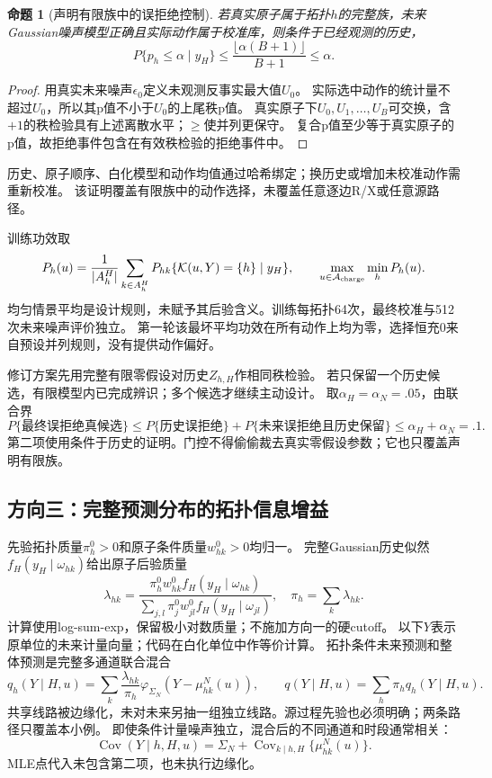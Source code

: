 \documentclass[UTF8,fontset=fandol,11pt,a4paper]{ctexart}
\newtheorem{proposition}{命题}
\begin{document}
\begin{proposition}[声明有限族中的误拒绝控制]
若真实原子属于拓扑$h$的完整族，未来Gaussian噪声模型正确且实际动作属于校准库，则条件于已经观测的历史，
\[
 P\{p_h\le\alpha\mid y_H\}
 \le\frac{\lfloor\alpha(B+1)\rfloor}{B+1}\le\alpha .
\]
\end{proposition}
\begin{proof}
用真实未来噪声$\epsilon_0$定义未观测反事实最大值$U_0$。
实际选中动作的统计量不超过$U_0$，所以其p值不小于$U_0$的上尾秩p值。
真实原子下$U_0,U_1,\ldots,U_B$可交换，含$+1$的秩检验具有上述离散水平；$\ge$使并列更保守。
复合p值至少等于真实原子的p值，故拒绝事件包含在有效秩检验的拒绝事件中。
\end{proof}
历史、原子顺序、白化模型和动作均值通过哈希绑定；换历史或增加未校准动作需重新校准。
该证明覆盖有限族中的动作选择，未覆盖任意逐边R/X或任意源路径。

训练功效取
\[
 P_h(u)=\frac1{|A_h^H|}\sum_{k\in A_h^H}
 P_{hk}\{\mathcal K(u,Y)=\{h\}\mid y_H\},
 \qquad \max_{u\in\mathcal A_{\rm charge}}\min_hP_h(u).
\]
均匀情景平均是设计规则，未赋予其后验含义。训练每拓扑64次，最终校准与512次未来噪声评价独立。
第一轮该最坏平均功效在所有动作上均为零，选择恒充0来自预设并列规则，没有提供动作偏好。

修订方案先用完整有限零假设对历史$Z_{h,H}$作相同秩检验。
若只保留一个历史候选，有限模型内已完成辨识；多个候选才继续主动设计。
取$\alpha_H=\alpha_N=.05$，由联合界
\[
 P\{\text{最终误拒绝真候选}\}
 \le P\{\text{历史误拒绝}\}
 +P\{\text{未来误拒绝且历史保留}\}
 \le\alpha_H+\alpha_N=.1 .
\]
第二项使用条件于历史的证明。门控不得偷偷裁去真实零假设参数；它也只覆盖声明有限族。

\subsection{方向三：完整预测分布的拓扑信息增益}
先验拓扑质量$\pi_h^0>0$和原子条件质量$w_{hk}^0>0$均归一。
完整Gaussian历史似然$f_H(y_H\mid\omega_{hk})$给出原子后验质量
\[
 \lambda_{hk}=
 \frac{\pi_h^0w_{hk}^0 f_H(y_H\mid\omega_{hk})}
 {\sum_{j,l}\pi_j^0w_{jl}^0f_H(y_H\mid\omega_{jl})},
 \quad \pi_h=\sum_k\lambda_{hk} .
\]
计算使用log-sum-exp，保留极小对数质量；不施加方向一的硬cutoff。
以下$Y$表示原单位的未来计量向量；代码在白化单位中作等价计算。
拓扑条件未来预测和整体预测是完整多通道联合混合
\[
 q_h(Y\mid H,u)=\sum_k\frac{\lambda_{hk}}{\pi_h}
   \varphi_{\Sigma_N}(Y-\mu^N_{hk}(u)),\qquad
 q(Y\mid H,u)=\sum_h\pi_hq_h(Y\mid H,u).
\]
共享线路被边缘化，未对未来另抽一组独立线路。源过程先验也必须明确；两条路径只覆盖本小例。
即使条件计量噪声独立，混合后的不同通道和时段通常相关：
\[
 \operatorname{Cov}(Y\mid h,H,u)=\Sigma_N+
 \operatorname{Cov}_{k\mid h,H}\{\mu^N_{hk}(u)\}.
\]
MLE点代入未包含第二项，也未执行边缘化。
\end{document}
